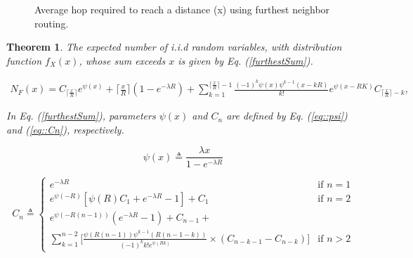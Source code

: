 \documentclass[12pt, draftclsnofoot, onecolumn]{IEEEtran}
\newtheorem{theorem}{Theorem}[section]
\begin{document}
\begin{figure*}[t!]
\begin{center}
\caption{Average hop required to reach a distance (x) using furthest neighbor routing.}
\label{figFurthestDistFormula}
\end{center}
\end{figure*}

\begin{theorem}
\label{theorem::3}
The expected number of i.i.d random variables, with distribution function $f_X(x)$, whose sum exceeds 
$x$ is given by Eq. (\ref{furthestSum}).

\begin{multline}
\label{furthestSum}
	N_F(x)= C_{\lceil \frac{x}{R} \rceil} e^{\psi (x)} + {\lceil \frac{x}{R} \rceil}(1-e^{-\lambda R}) + 
	\sum_{k=1}^{\lceil \frac{x}{R} \rceil -1} \frac{(-1)^k \psi (x) \psi^{k-1} (x-kR) }{k!}  e^{\psi (x-RK)} C_{\lceil \frac{x}{R} \rceil - k},
\end{multline}

In Eq. (\ref{furthestSum}), parameters $\psi (x)$ and $C_n$ are defined 
by Eq. (\ref{eq::psi}) and (\ref{eq::Cn}), respectively.

\begin{equation}
\label{eq::psi}
	\psi (x) \triangleq \frac{\lambda x}{1-e^{-\lambda R}}
\end{equation}

\begin{equation}
\label{eq::Cn}
	C_n \triangleq 
	\left\{
		\begin{array}{ll}
			e^{-\lambda R}  & \mbox{if } n=1 \\
			e^{\psi (-R)}[\psi(R) C_1+e^{-\lambda R}-1] + C_1 & \mbox{if } n=2 \\
			e^{\psi (-R(n-1))}(e^{-\lambda R}-1) + C_{n-1} + \\ \sum\limits_{k=1}^{n-2} \bigg[ \frac{\psi (R(n-1)) \psi^{k-1} (R(n-1-k)) }{(-1)^k k! e^{\psi (Rk)}}  \times  (C_{n-k-1}-C_{n-k})  \bigg]   & \mbox{if } n>2
		\end{array}
	\right.
\end{equation}



\end{theorem}
\end{document}
